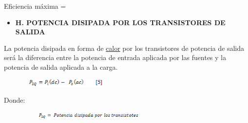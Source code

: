 \documentclass[12pt]{article}
\begin{document}

Eficiencia máxima = \par

\begin{itemize}
	\item \textbf{H. POTENCIA DISIPADA POR LOS TRANSISTORES DE SALIDA}
\end{itemize}\par

La potencia disipada en forma de \href{https://www.monografias.com/trabajos15/transf-calor/transf-calor.shtml}{calor} por los transistores de potencia de salida será la diferencia entre la potencia de entrada aplicada por las fuentes y la potencia de salida aplicada a la carga.\par




\begin{figure}[H]
	\begin{Center}
		\includegraphics[width=1.82in,height=0.17in]{./media/image24.gif}
	\end{Center}
\end{figure}



\par

Donde:\par




\begin{figure}[H]
	\begin{Center}
		\includegraphics[width=2.8in,height=0.15in]{./media/image25.gif}
	\end{Center}
\end{figure}



\par
\end{document}
